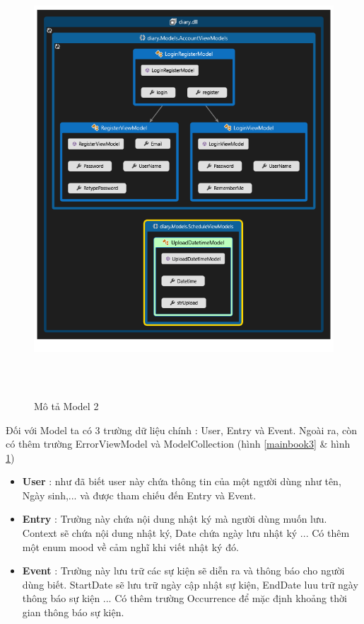 \documentclass[a4paper]{article}
\begin{document}
\begin{enumerate}
		\begin{figure}[!h]
	  \centering
      \includegraphics[height=460pt,width=400pt]{Images/h5.png}
	  \caption{Mô tả Model 2}
	  \label{mainbook4}
	   \end{figure}


	Đối với Model ta có 3 trường dữ liệu chính : User, Entry và Event. Ngoài ra, còn có thêm trường ErrorViewModel và ModelCollection (hình \ref{mainbook3} \& hình \ref{mainbook4})

	\begin{itemize}
		\item \textbf{User} : như đã biết user này chứa thông tin của một người dùng như tên, Ngày sinh,... và được tham chiếu đến Entry và Event.
		\item \textbf{Entry} : Trường này chứa nội dung nhật ký mà người dùng muốn lưu. Context sẽ chứa nội dung nhật ký, Date chứa ngày lưu nhật ký ... Có thêm một enum mood về cảm nghĩ khi viết nhật ký đó.

		\item \textbf{Event} : Trường này lưu trữ các sự kiện sẽ diễn ra và thông báo cho người dùng biết. StartDate sẽ lưu trữ ngày cập nhật sự kiện, EndDate luu trữ ngày thông báo sự kiện ... Có thêm trường Occurrence để mặc định khoảng thời gian thông báo sự kiện.




\end{itemize}
\end{enumerate}
\end{document}
